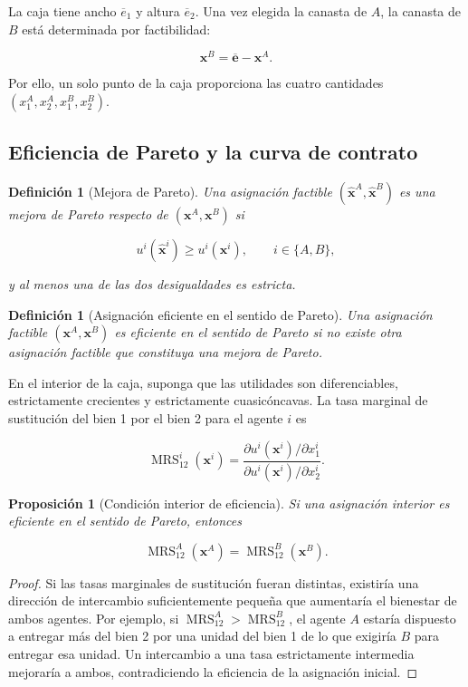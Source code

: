 \documentclass[12pt]{article}
\theoremstyle{cideplain}
\newtheorem{proposition}[theorem]{Proposición}
\theoremstyle{cidedef}
\newtheorem{definition}[theorem]{Definición}
\DeclareMathOperator{\MRS}{MRS}
\newcommand{\e}{\bm e}
\newcommand{\x}{\mathbf{x}}
\begin{document}
La caja tiene ancho \(\overline e_1\) y altura \(\overline e_2\). Una vez elegida la canasta
de \(A\), la canasta de \(B\) está determinada por factibilidad:

\[
  \x^B=\overline{\e}-\x^A.
\]

Por ello, un solo punto de la caja proporciona las cuatro cantidades
\((x_1^A,x_2^A,x_1^B,x_2^B)\).

\subsection{Eficiencia de Pareto y la curva de contrato}

\begin{definition}[Mejora de Pareto]
Una asignación factible \((\widehat{\x}^A,\widehat{\x}^B)\) es una mejora de Pareto
respecto de \((\x^A,\x^B)\) si

\[
  u^i(\widehat{\x}^i)\geq u^i(\x^i),
  \qquad i\in\{A,B\},
\]

y al menos una de las dos desigualdades es estricta.
\end{definition}

\begin{definition}[Asignación eficiente en el sentido de Pareto]
Una asignación factible \((\x^A,\x^B)\) es eficiente en el sentido de Pareto si no existe
otra asignación factible que constituya una mejora de Pareto.
\end{definition}

En el interior de la caja, suponga que las utilidades son diferenciables, estrictamente
crecientes y estrictamente cuasicóncavas. La tasa marginal de sustitución del bien 1 por el
bien 2 para el agente \(i\) es

\[
  \MRS_{12}^i(\x^i)
  =\frac{\partial u^i(\x^i)/\partial x_1^i}
         {\partial u^i(\x^i)/\partial x_2^i}.
\]

\begin{proposition}[Condición interior de eficiencia]
Si una asignación interior es eficiente en el sentido de Pareto, entonces

\begin{equation}
  \MRS_{12}^A(\x^A)=\MRS_{12}^B(\x^B).
  \label{eq:mrs-efficiency}
\end{equation}
\end{proposition}

\begin{proof}
Si las tasas marginales de sustitución fueran distintas, existiría una dirección de
intercambio suficientemente pequeña que aumentaría el bienestar de ambos agentes. Por
ejemplo, si \(\MRS_{12}^A>\MRS_{12}^B\), el agente \(A\) estaría dispuesto a entregar más
del bien 2 por una unidad del bien 1 de lo que exigiría \(B\) para entregar esa unidad.
Un intercambio a una tasa estrictamente intermedia mejoraría a ambos, contradiciendo la
eficiencia de la asignación inicial.
\end{proof}
\end{document}
